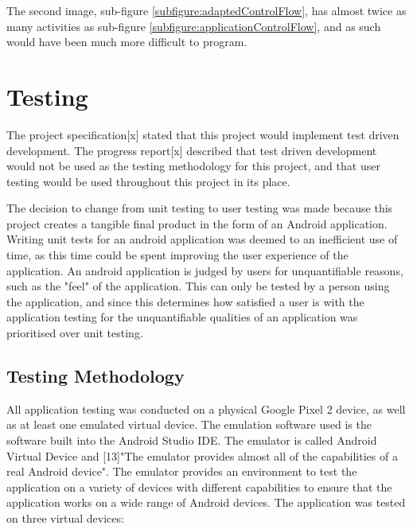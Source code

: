 \documentclass{article}
\begin{document}
The second image, sub-figure \ref{subfigure:adaptedControlFlow}, has almost twice as many activities as sub-figure \ref{subfigure:applicationControlFlow}, and as such would have been much more difficult to program. 

%
%
%
%
%


\section{Testing}
\label{section:testing}

The project specification[x] stated that this project would implement test driven development. The progress report[x] described that test driven development would not be used as the testing methodology for this project, and that user testing would be used throughout this project in its place. \par

The decision to change from unit testing to user testing was made because this project creates a tangible final product in the form of an Android application. Writing unit tests for an android application was deemed to an inefficient use of time, as this time could be spent improving the user experience of the application. An android application is judged by users for unquantifiable reasons, such as the "feel" of the application. This can only be tested by a person using the application, and since this determines how satisfied a user is with the application testing for the unquantifiable qualities of an application was prioritised over unit testing. \par

\subsection{Testing Methodology}

All application testing was conducted on a physical Google Pixel 2 device, as well as at least one emulated virtual device. The emulation software used is the software built into the Android Studio IDE. The emulator is called Android Virtual Device and [13]"The emulator provides almost all of the capabilities of a real Android device". The emulator provides an environment to test the application on a variety of devices with different capabilities to ensure that the application works on a wide range of Android devices. The application was tested on three virtual devices: 
\end{document}
